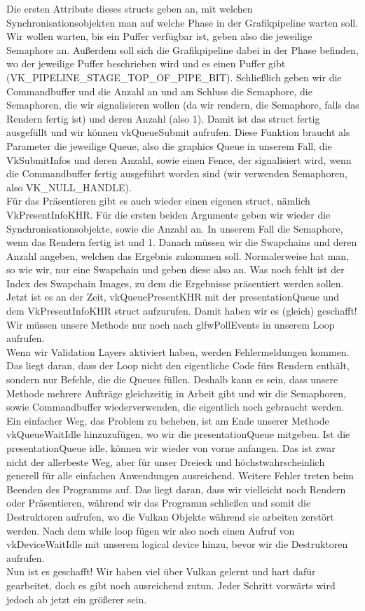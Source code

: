 \documentclass[11pt,a4paper]{report}
\begin{document}
Die ersten Attribute dieses structs geben an, mit welchen Synchronisationsobjekten man auf welche Phase in der Grafikpipeline warten soll. Wir wollen warten, bis ein Puffer verfügbar ist, geben also die jeweilige Semaphore an. Außerdem soll sich die Grafikpipeline dabei in der Phase befinden, wo der jeweilige Puffer beschrieben wird und es einen Puffer gibt\\(VK\_PIPELINE\_STAGE\_TOP\_OF\_PIPE\_BIT). Schließlich geben wir die Commandbuffer und die Anzahl an und am Schluss die Semaphore, die Semaphoren, die wir signalisieren wollen (da wir rendern, die Semaphore, falls das Rendern fertig ist) und deren Anzahl (also 1). Damit ist das struct fertig ausgefüllt und wir können vkQueueSubmit aufrufen. Diese Funktion braucht als Parameter die jeweilige Queue, also die graphics Queue in unserem Fall, die VkSubmitInfos und deren Anzahl, sowie einen Fence, der signalisiert wird, wenn die Commandbuffer fertig ausgeführt worden sind (wir verwenden Semaphoren, also VK\_NULL\_HANDLE).\\
Für das Präsentieren gibt es auch wieder einen eigenen struct, nämlich VkPresentInfoKHR. Für die ersten beiden Argumente geben wir wieder die Synchronisationsobjekte, sowie die Anzahl an. In unserem Fall die Semaphore, wenn das Rendern fertig ist und 1. Danach müssen wir die Swapchains und deren Anzahl angeben, welchen das Ergebnis zukommen soll. Normalerweise hat man, so wie wir, nur eine Swapchain und geben diese also an. Was noch fehlt ist der Index des Swapchain Images, zu dem die Ergebnisse präsentiert werden sollen.\\
Jetzt ist es an der Zeit, vkQueuePresentKHR mit der presentationQueue und dem VkPresentInfoKHR struct aufzurufen. Damit haben wir es (gleich) geschafft! Wir müssen unsere Methode nur noch nach glfwPollEvents in unserem Loop aufrufen.\\
Wenn wir Validation Layers aktiviert haben, werden Fehlermeldungen kommen. Das liegt daran, dass der Loop nicht den eigentliche Code fürs Rendern enthält, sondern nur Befehle, die die Queues füllen. Deshalb kann es sein, dass unsere Methode mehrere Aufträge gleichzeitig in Arbeit gibt und wir die Semaphoren, sowie Commandbuffer wiederverwenden, die eigentlich noch gebraucht werden. Ein einfacher Weg, das Problem zu beheben, ist am Ende unserer Methode vkQueueWaitIdle hinzuzufügen, wo wir die presentationQueue mitgeben. Ist die presentationQueue idle, können wir wieder von vorne anfangen. Das ist zwar nicht der allerbeste Weg, aber für unser Dreieck und höchstwahrscheinlich generell für alle einfachen Anwendungen ausreichend. Weitere Fehler treten beim Beenden des Programms auf. Das liegt daran, dass wir vielleicht noch Rendern oder Präsentieren, während wir das Programm schließen und somit die Destruktoren aufrufen, wo die Vulkan Objekte während sie arbeiten zerstört werden. Nach dem while loop fügen wir also noch einen Aufruf von vkDeviceWaitIdle mit unserem logical device hinzu, bevor wir die Destruktoren aufrufen.\\
Nun ist es geschafft! Wir haben viel über Vulkan gelernt und hart dafür gearbeitet, doch es gibt noch ausreichend zutun. Jeder Schritt vorwärts wird jedoch ab jetzt ein größerer sein.
\end{document}
